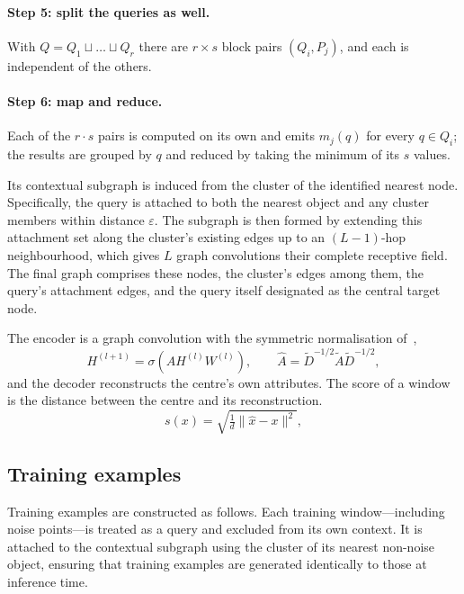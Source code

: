 \documentclass{article}
\begin{document}
\paragraph{Step 5: split the queries as well.} With $Q = Q_1 \sqcup \dots \sqcup Q_r$ there
are $r \times s$ block pairs $(Q_i, P_j)$, and each is independent of the others.

\paragraph{Step 6: map and reduce.} Each of the $r \cdot s$ pairs is computed on its own
and emits $m_j(q)$ for every $q \in Q_i$; the results are grouped by $q$ and reduced by
taking the minimum of its $s$ values.

Its contextual subgraph is induced from the cluster of the identified nearest node. 
Specifically, the query is attached to both the nearest object and any cluster members 
within distance $\varepsilon$. The subgraph is then formed by extending this attachment 
set along the cluster's existing edges up to an $(L-1)$-hop neighbourhood, which gives 
$L$ graph convolutions their complete receptive field. The final graph comprises 
these nodes, the cluster's edges among them, the query's attachment edges, and the 
query itself designated as the central target node.

The encoder is a graph convolution with the symmetric normalisation of~\cite{kipf2017gcn},
\begin{equation}
  H^{(l+1)} = \sigma\!\left( \hat{A} H^{(l)} W^{(l)} \right), \qquad
  \hat{A} = \tilde{D}^{-1/2}\tilde{A}\tilde{D}^{-1/2},
\end{equation}
and the decoder reconstructs the centre's own attributes. The score of a window is the
distance between the centre and its reconstruction.
\begin{equation}
  s(x) = \sqrt{\tfrac{1}{d}\lVert \hat{x} - x \rVert^{2}} ,
\end{equation}

\subsection{Training examples}

Training examples are constructed as follows. Each training window—including noise points—is 
treated as a query and excluded from its own context. It is attached to the contextual 
subgraph using the cluster of its nearest non-noise object, ensuring that training examples 
are generated identically to those at inference time.
\end{document}
